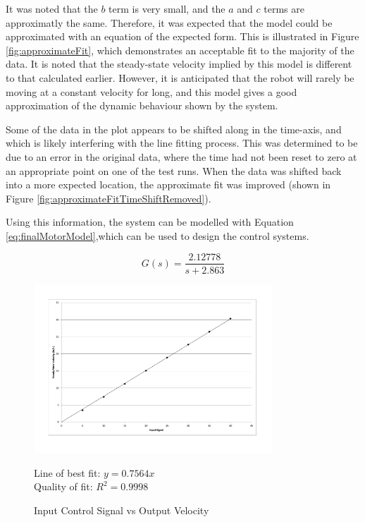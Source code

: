 \documentclass[10pt]{article}
\begin{document}
It was noted that the $b$ term is very small, and the $a$ and $c$ terms are
approximatly the same.  Therefore, it was expected that the model could be
approximated with an equation of the expected form.  This is illustrated in
Figure \ref{fig:approximateFit}, which demonstrates an acceptable fit to the
majority of the data.  It is noted that the steady-state velocity implied by
this model is different to that calculated earlier.  However, it is anticipated
that the robot will rarely be moving at a constant velocity for long, and this
model gives a good approximation of the dynamic behaviour shown by the system.

Some of the data in the plot appears to be shifted along in the time-axis, and
which is likely interfering with the line fitting process. This was determined
to be due to an error in the original data, where the time had not been reset to
zero at an appropriate point on one of the test runs. When the data was shifted
back into a more expected location, the approximate fit was improved (shown in
Figure \ref{fig:approximateFitTimeShiftRemoved}).

Using this information, the system can be modelled with Equation
\ref{eq:finalMotorModel},which can be used to design the control systems.

\begin{equation}
 \label{eq:finalMotorModel}
 G\left(s\right) = \frac{2.12778}{s+2.863}
\end{equation}

\begin{figure}
 \centering
 \includegraphics[width=0.8\textwidth]{Images/input-signal-vs-output-speed}
 \caption{Input Control Signal vs Output Velocity}
 \label{fig:inputOutputVelocityGraph}

 Line of best fit: $y=0.7564x$ \\
 Quality of fit: $R^2 = 0.9998$
\end{figure}
\end{document}
